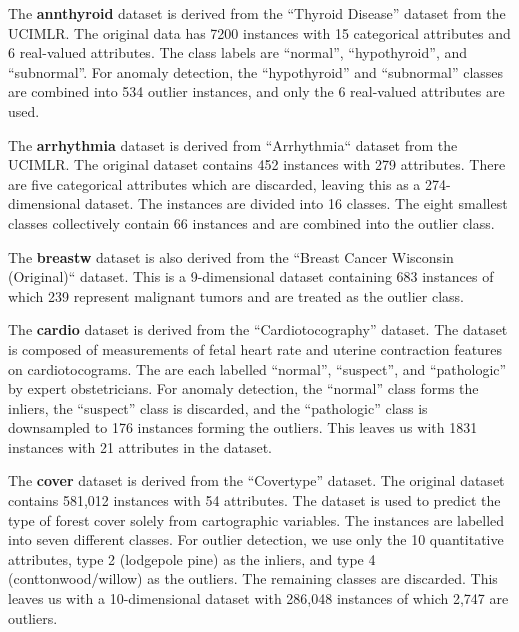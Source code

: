 The \textbf{annthyroid} dataset is derived from the ``Thyroid Disease'' dataset from the UCIMLR\@.
The original data has 7200 instances with 15 categorical attributes and 6 real-valued attributes.
The class labels are ``normal'', ``hypothyroid'', and ``subnormal''.
For anomaly detection, the ``hypothyroid'' and ``subnormal'' classes are combined into 534 outlier instances, and only the 6 real-valued attributes are used.

The \textbf{arrhythmia} dataset is derived from ``Arrhythmia`` dataset from the UCIMLR\@.
The original dataset contains 452 instances with 279 attributes.
There are five categorical attributes which are discarded, leaving this as a 274-dimensional dataset.
The instances are divided into 16 classes.
The eight smallest classes collectively contain 66 instances and are combined into the outlier class.

The \textbf{breastw} dataset is also derived from the ``Breast Cancer Wisconsin (Original)`` dataset.
This is a 9-dimensional dataset containing 683 instances of which 239 represent malignant tumors and are treated as the outlier class.

The \textbf{cardio} dataset is derived from the ``Cardiotocography'' dataset.
The dataset is composed of measurements of fetal heart rate and uterine contraction features on cardiotocograms.
The are each labelled ``normal'', ``suspect'', and ``pathologic'' by expert obstetricians.
For anomaly detection, the ``normal'' class forms the inliers, the ``suspect'' class is discarded, and the ``pathologic'' class is downsampled to 176 instances forming the outliers.
This leaves us with 1831 instances with 21 attributes in the dataset.

The \textbf{cover} dataset is derived from the ``Covertype'' dataset.
The original dataset contains 581,012 instances with 54 attributes.
The dataset is used to predict the type of forest cover solely from cartographic variables.
The instances are labelled into seven different classes.
For outlier detection, we use only the 10 quantitative attributes, type 2 (lodgepole pine) as the inliers, and type 4 (conttonwood/willow) as the outliers.
The remaining classes are discarded.
This leaves us with a 10-dimensional dataset with 286,048 instances of which 2,747 are outliers.

